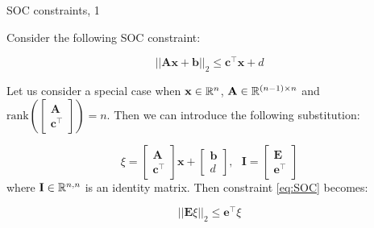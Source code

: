 \documentclass{beamer}
\begin{document}
\begin{frame}{SOC constraints, 1}
	\begin{flushleft}
		
		Consider the following SOC constraint:
		
		\begin{equation}
			\label{eq:SOC}
			||\mathbf{A}\mathbf{x} + \mathbf{b}||_2 \leq 
			\mathbf{c}^\top \mathbf{x} + d
		\end{equation}
		
		Let us consider a special case when $\mathbf{x} \in \mathbb{R}^n$, $\mathbf{A} \in \mathbb{R}^{(n-1) \times n}$ and $\text{rank}\left(\begin{bmatrix}
			\mathbf{A} \\ \mathbf{c}^\top
		\end{bmatrix}\right) = n$. Then we can introduce the following substitution:
		
		\begin{equation}
			\xi = \begin{bmatrix}
				\mathbf{A} \\ \mathbf{c}^\top
			\end{bmatrix}
			\mathbf{x} + 
			\begin{bmatrix}
				\mathbf{b} \\ d
			\end{bmatrix}, 
		\ \ \ 
		\mathbf{I} = 
		\begin{bmatrix}
			\mathbf{E} \\ \mathbf{e}^\top
		\end{bmatrix}
		\end{equation}
%
where $\mathbf{I} \in\mathbb{R}^{n, n}$ is an identity matrix. Then constraint \eqref{eq:SOC} becomes:

		\begin{equation}
	||\mathbf{E}\xi||_2 \leq 
	\mathbf{e}^\top \xi
		\end{equation}
		
	\end{flushleft}
\end{frame}
\end{document}
